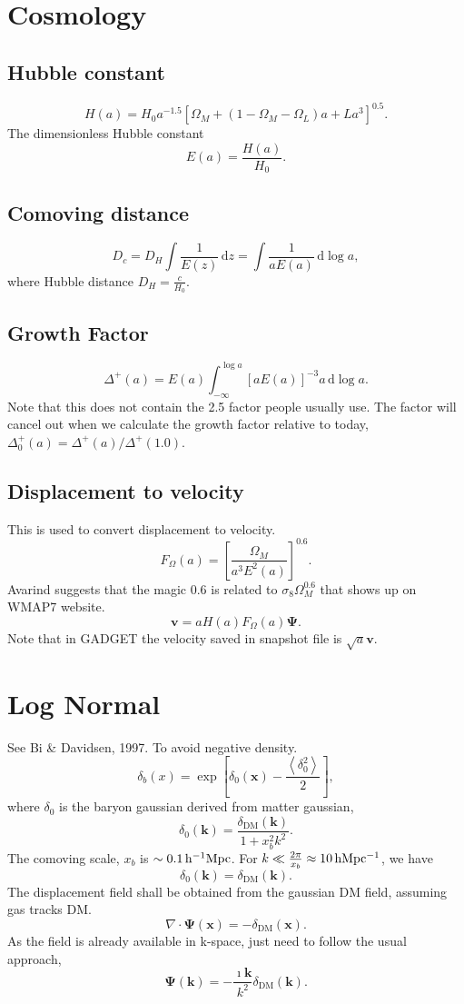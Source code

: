 \documentclass{paper}
\begin{document}
\newcommand{\diff}{\,\mathrm{d}}
\section{Cosmology}
\subsection{Hubble constant}
\[
    H(a) = H_0 a^{-1.5} \left[\Omega_M + 
           (1 - \Omega_M - \Omega_L) a +
       L a^3 \right] ^ {0.5}  .
\] 
The dimensionless Hubble constant
\[
    E(a) = \frac{H(a)}{H_0} .
\]

\subsection{Comoving distance}
\[
    D_c = D_H \int \frac{1}{E(z)} \diff z 
        = \int \frac{1}{a E(a)} \diff \log a,
\]
where Hubble distance $D_H = \frac{c}{H_0}$.
\subsection{Growth Factor}
\[
    \Delta^+(a) = E(a) 
\int_{-\infty}^{\log a} \left[a E(a)\right]^{-3} a \diff \log a .
\]
Note that this does not contain the 2.5 factor people
usually use. The factor will cancel out when we calculate
the growth factor relative to today,
$\Delta^+_0(a) = \Delta^+(a) / \Delta^+(1.0)$.
\subsection{Displacement to velocity}
This is used to convert displacement to velocity. 
\[
    F_\Omega(a) = \left[\frac{\Omega_M}{a^3 E^2(a)}\right]^{0.6} .
\]
Avarind suggests that the magic 0.6 is related to $\sigma_8
\Omega_M ^ 0.6$ that shows up on WMAP7 website.
\[
    \mathbf{v} = a H(a) F_\Omega(a) \mathbf{\Psi} .
\]
Note that in GADGET the velocity saved in snapshot file is 
$\sqrt{a}\mathbf{v}$.

\section{Log Normal}
See Bi \& Davidsen, 1997. To avoid negative density.
\[
    \delta_b (x) = \exp\left[
        \delta_0 (\mathbf{x}) 
      - \frac{\left<\delta^2_0\right>}{2}
    \right],
\]
where $\delta_0$ is the baryon gaussian derived from 
 matter gaussian,
\[
    \delta_0(\mathbf{k}) = \frac{\delta_\mathrm{DM}
    (\mathbf{k})}{1 + x^2_b k^2}.
\]
The comoving scale, $x_b$ is $\sim \unit[0.1]{h^{-1}Mpc}$.
For $k \ll \frac{2 \pi}{x_b} \approx \unit[10]{h
    Mpc^{-1}}$, we have
\[
    \delta_0(\mathbf{k}) = \delta_\mathrm{DM}(\mathbf{k}) .
\]
The displacement field shall be obtained from the gaussian
DM field, assuming gas tracks DM.
\[
    \nabla \cdot \mathbf{\Psi}(\mathbf{x}) =
    -\delta_\mathrm{DM}(\mathbf{x}) .
\]
As the field is already available in k-space, just need to
follow the usual approach,
\[
    \mathbf{\Psi}(\mathbf{k}) = 
    -\frac{\imath \mathbf{k}}{k^2} \delta_\mathrm{DM}(\mathbf{k}) .
\]
\end{document}
